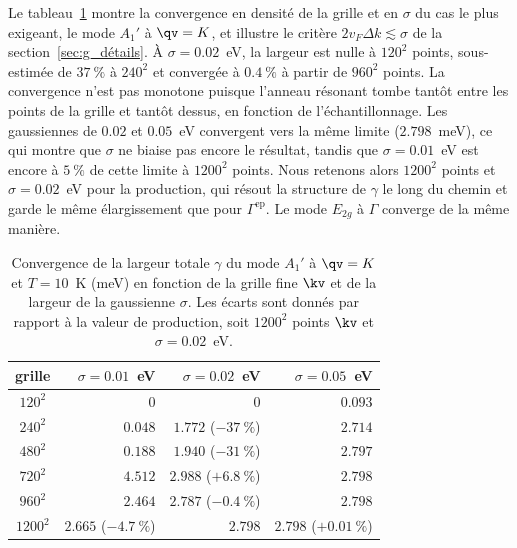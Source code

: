 
Le tableau~\ref{tab:gamma_ph_conv} montre la convergence en densité de la grille et en $\sigma$ du cas le plus exigeant, le mode $A_1'$ à $\qv=K$, et illustre le critère $2v_F\Delta k\lesssim\sigma$ de la section~\ref{sec:g_détails}. À $\sigma=0.02$~eV, la largeur est nulle à $120^2$ points, sous-estimée de $37~\%$ à $240^2$ et convergée à $0.4~\%$ à partir de $960^2$ points. La convergence n'est pas monotone puisque l'anneau résonant tombe tantôt entre les points de la grille et tantôt dessus, en fonction de l'échantillonnage. Les gaussiennes de $0.02$ et $0.05$~eV convergent vers la même limite ($2.798$~meV), ce qui montre que $\sigma$ ne biaise pas encore le résultat, tandis que $\sigma=0.01$~eV est encore à $5~\%$ de cette limite à $1200^2$ points. Nous retenons alors $1200^2$ points et $\sigma=0.02$~eV pour la production, qui résout la structure de $\gamma$ le long du chemin et garde le même élargissement que pour $\Gamma^\text{ep}$. Le mode $E_{2g}$ à $\Gamma$ converge de la même manière.
\begin{table}[htbp]
    \centering
    \caption[Convergence de la largeur du mode $A_1'$ au point $K$.]{Convergence de la largeur totale $\gamma$ du mode $A_1'$ à $\qv=K$ et $T=10$~K (meV) en fonction de la grille fine $\kv$ et de la largeur de la gaussienne $\sigma$. Les écarts sont donnés par rapport à la valeur de production, soit $1200^2$ points $\kv$ et $\sigma=0.02$~eV.}
    \label{tab:gamma_ph_conv}
    \begin{tabular}{crrr}
        \hline\hline
        grille & $\sigma=0.01$~eV & $\sigma=0.02$~eV & $\sigma=0.05$~eV \\
        \hline
        $120^2$  & $0$ & $0$ & $0.093$ \\
        $240^2$  & $0.048$ & $1.772$ ($-37~\%$) & $2.714$ \\
        $480^2$  & $0.188$ & $1.940$ ($-31~\%$) & $2.797$ \\
        $720^2$  & $4.512$ & $2.988$ ($+6.8~\%$) & $2.798$ \\
        $960^2$  & $2.464$ & $2.787$ ($-0.4~\%$) & $2.798$ \\
        $1200^2$ & $2.665$ ($-4.7~\%$) & $2.798$ & $2.798$ ($+0.01~\%$) \\
        \hline\hline
    \end{tabular}
\end{table}


